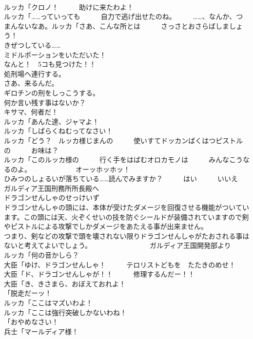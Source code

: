 \documentclass[8pt]{extreport}
\begin{document}
\begin{CJK}{UTF8}{min}
\\	ルッカ「クロノ！　　　助けに来たわよ！	
\\	ルッカ「……っていっても　　　自力で逃げ出せたのね。　　　……、なんか、つまんないなあ。ルッカ「さあ、こんな所とは　　　さっさとおさらばしましょう！	
\\	きぜつしている……	
\\	ミドルポーションをいただいた！	
\\	なんと！　5コも見つけた！！	
\\	処刑場へ連行する。	
\\	さあ、来るんだ。	
\\	ギロチンの刑をしっこうする。	
\\	何か言い残す事はないか？	
\\	キサマ、何者だ！	
\\	ルッカ「あんた達、ジャマよ！	
\\	ルッカ「しばらくねむってなさい！	
\\	ルッカ「どう？　ルッカ様じまんの　　　使いすてドッカンばくはつピストルの　　　お味は？	
\\	ルッカ「このルッカ様の　　　行く手をはばむオロカモノは　　　みんなこうなるのよ。　　　　　　　オーッホッホッ！	
\\	ひみつのしょるいが落ちている……読んでみますか？　　　はい　　　いいえ	
\\	ガルディア王国刑務所所長殿へ	
\\	ドラゴンせんしゃのせっけいず	
\\	ドラゴンせんしゃの頭には、本体が受けたダメージを回復させる機能がついています。この頭には天、火ぞくせいの技を防ぐシールドが装備されていますので剣やピストルによる攻撃でしかダメージをあたえる事が出来ません。	
\\	つまり、剣などの攻撃で頭を壊されない限りドラゴンせんしゃがたおされる事はないと考えてよいでしょう。　　　　　　　　　ガルディア王国開発部より	
\\	ルッカ「何の音かしら？	
\\	大臣「ゆけ、ドラゴンせんしゃ！　　　テロリストどもを　たたきのめせ！	
\\	大臣「ド、ドラゴンせんしゃが！！　　　修理するんだー！！	
\\	大臣「き、きさまら、おぼえておれよ！	
\\	「脱走だーッ！	
\\	ルッカ「ここはマズいわよ！	
\\	ルッカ「ここは強行突破しかないわね！	
\\	「おやめなさい！	
\\	兵士「マールディア様！	

\end{CJK}
\end{document}
